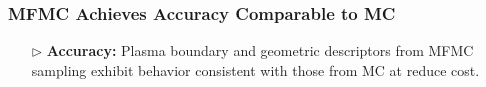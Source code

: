 \documentclass{beamer}
\begin{document}
\begin{frame}[t]
    \frametitle{MFMC Achieves Accuracy Comparable to MC}
\begin{itemize}[leftmargin=5pt] 
\item[$\triangleright$] \textcolor{myblue3}{\bf Accuracy:} 
{\footnotesize Plasma boundary and geometric descriptors from MFMC sampling exhibit behavior consistent with those from MC at reduce cost.}
\begin{figure}[ht!]\centering
{}
\end{figure}
\end{itemize}
\end{frame}
\end{document}

